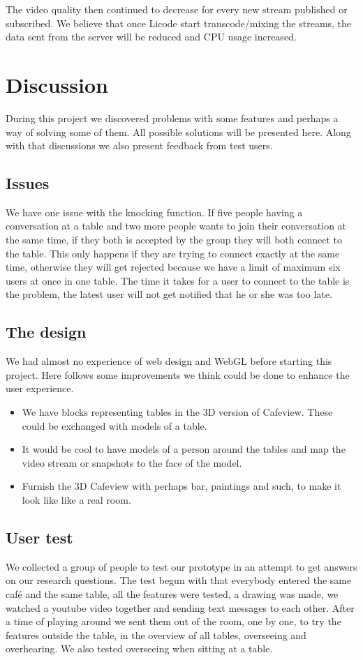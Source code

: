 \documentclass[12pt, titlepage]{article}
\begin{document}
The video quality then continued to decrease for every new stream published or subscribed. We believe that once Licode start transcode/mixing the streams, the data sent from the server will be reduced and CPU usage increased. 
\section{Discussion}
During this project we discovered problems with some features and perhaps a way of solving some of them. All possible solutions will be presented here. Along with that discussions we also present feedback from test users.
\subsection{Issues}
We have one issue with the knocking function. If five people having a conversation at a table and two more people wants to join their conversation at the same time, if they both is accepted by the group they will both connect to the table. This only happens if they are trying to connect exactly at the same time, otherwise they will get rejected because we have a limit of maximum six users at once in one table. The time it takes for a user to connect to the table is the problem, the latest user will not get notified that he or she was too late. 
\subsection{The design}
We had almost no experience of web design and WebGL before starting this project. Here follows some improvements we think could be done to enhance the user experience.
\begin{itemize}
\item We have blocks representing tables in the 3D version of Cafeview. These could be exchanged with models of a table. 
\item It would be cool to have models of a person around the tables and map the video stream or snapshots to the face of the model.
\item Furnish the 3D Cafeview with perhaps bar, paintings and such, to make it look like like a real room.
\end{itemize}
\subsection{User test}
We collected a group of people to test our prototype in an attempt to get answers on our research questions. The test begun with that everybody entered the same café and the same table, all the features were tested, a drawing was made, we watched a youtube video together and sending text messages to each other. After a time of playing around we sent them out of the room, one by one, to try the features outside the table, in the overview of all tables, overseeing and overhearing. We also tested overseeing when sitting at a table.
\end{document}
